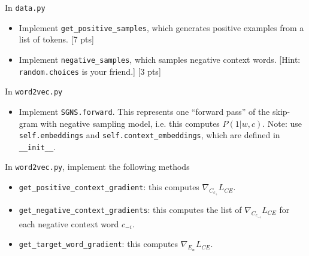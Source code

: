 \documentclass[11pt]{article}
\begin{document}
\vspace{2em}
 In \texttt{data.py}
\begin{itemize}
  \item Implement \texttt{get\_positive\_samples}, which generates positive examples from a list of tokens. [7 pts]
  \item Implement \texttt{negative\_samples}, which samples negative context words.  [Hint: \texttt{random.choices} is your friend.] [3 pts]
\end{itemize}

\vspace{2em}
 In \texttt{word2vec.py}
\begin{itemize}
  \item Implement \texttt{SGNS.forward}.  This represents one ``forward pass'' of the skip-gram with negative sampling model, i.e. this computes $P(1 | w, c)$.  Note: use \texttt{self.embeddings} and \texttt{self.context\_embeddings}, which are defined in \texttt{\_\_init\_\_}.
\end{itemize}

\vspace{2em}
 In \texttt{word2vec.py}, implement the following methods
\begin{itemize}
  \item \texttt{get\_positive\_context\_gradient}: this computes $\nabla_{C_{c_+}} L_{CE}$.
  \item \texttt{get\_negative\_context\_gradients}: this computes the list of $\nabla_{C_{c_{-i}}} L_{CE}$ for each negative context word $c_{-i}$.
  \item \texttt{get\_target\_word\_gradient}: this computes $\nabla_{E_w} L_{CE}$.
\end{itemize}
\end{document}
